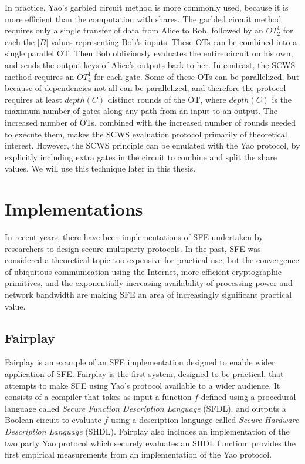 In practice, Yao's garbled circuit method is more commonly used, because
it is more efficient than the computation with shares. The garbled
circuit method requires only a single transfer of data from Alice
to Bob, followed by an $OT_{2}^{1}$ for each the $|B|$ values representing
Bob's inputs. These OTs can be combined into a single parallel OT.
Then Bob obliviously evaluates the entire circuit on his own, and
sends the output keys of Alice's outputs back to her. In contrast,
the SCWS method requires an $OT_{4}^{1}$ for each gate. Some of these
OTs can be parallelized, but because of dependencies not all can be
parallelized, and therefore the protocol requires at least $depth(C)$
distinct rounds of the OT, where $depth(C)$ is the maximum number
of gates along any path from an input to an output. The increased
number of OTs, combined with the increased number of rounds needed
to execute them, makes the SCWS evaluation protocol primarily of theoretical
interest. However, the SCWS principle can be emulated with the Yao
protocol, by explicitly including extra gates in the circuit to combine
and split the share values. We will use this technique later in this
thesis.


\section{Implementations}

In recent years, there have been implementations of SFE undertaken
by researchers to design secure multiparty protocols. In the past,
SFE was considered a theoretical topic too expensive for practical
use, but the convergence of ubiquitous communication using the Internet,
more efficient cryptographic primitives, and the exponentially increasing
availability of processing power and network bandwidth are making
SFE an area of increasingly significant practical value.


\subsection{Fairplay \label{sub:Fairplay}}

Fairplay \cite{Fairplay} is an example of an SFE implementation designed
to enable wider application of SFE. Fairplay is the first system,
designed to be practical, that attempts to make SFE using Yao's protocol
available to a wider audience. It consists of a compiler that takes
as input a function $f$ defined using a procedural language called
\emph{Secure Function Description Language} (SFDL), and outputs a
Boolean circuit to evaluate $f$ using a description language called
\emph{Secure Hardware Description Language} (SHDL). Fairplay also
includes an implementation of the two party Yao protocol which securely
evaluates an SHDL function. \cite{Fairplay} provides the first empirical
measurements from an implementation of the Yao protocol.


